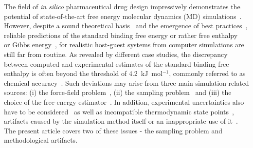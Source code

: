 \documentclass[9pt,lessons,pubversion]{livecoms}
\begin{document}
The field of \textit{in silico} pharmaceutical drug design impressively demonstrates  the potential of state-of-the-art free energy molecular dynamics (MD) simulations~\cite{leelananda2016computational}.
However, despite a sound theoretical basis~\cite{gilson1997statistical, boresch2003absolute} and the emergence of best practices~\cite{pohorille2010good}, 
reliable predictions of the standard binding free energy or rather free enthalpy~\cite{19781} or Gibbs energy~\cite{10.1039/9781847557889}, 
for realistic host-guest systems from computer simulations are still far from routine. 
As revealed by different case studies, the discrepancy between computed and experimental estimates of the standard binding free enthalpy is often beyond the threshold of 4.2~kJ~mol$^{-1}$, 
commonly referred to as chemical accuracy~\cite{pople1999nobel}.
Such deviations may arise from three main simulation-related sources: 
(i) the force-field problem~\cite{rocklin2013calculating,yin2015toward}, (ii) the sampling problem~\cite{zuckerman2011equilibrium} and (iii) the choice of the free-energy estimator~\cite{christ2010basic}. 
In addition, experimental uncertainties also have to be considered~\cite{van2006biomolecular} as well as incompatible thermodynamic state points~\cite{konig2012predicting}, 
artifacts caused by the simulation method itself or an inappropriate use of it~\cite{wong2016good}.
The present article covers two of these issues - the sampling problem and methodological artifacts.
\end{document}
